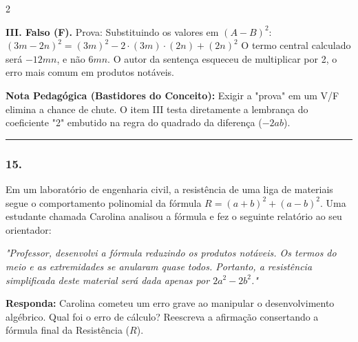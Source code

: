 \begin{multicols*}{2}
\begin{tcolorbox}[colback=CorTitUm!5, colframe=CorTitUm, boxrule=1pt, arc=4pt, left=6pt, right=6pt, top=6pt, bottom=6pt]
    \textbf{III. Falso (F).}
    Prova: Substituindo os valores em $ (A - B)^2 $:
    $ (3m - 2n)^2 = (3m)^2 - 2 \cdot (3m) \cdot (2n) + (2n)^2 $
    O termo central calculado será $ -12mn $, e não $ 6mn $. O autor da sentença esqueceu de multiplicar por 2, o erro mais comum em produtos notáveis.
    \end{tcolorbox}
    \vspace{0.15cm}
    
    \begin{boxexplicacao}
    \textbf{Nota Pedagógica (Bastidores do Conceito):} Exigir a "prova" em um V/F elimina a chance de chute. O item III testa diretamente a lembrança do coeficiente "2" embutido na regra do quadrado da diferença ($ -2ab $).
    \end{boxexplicacao}
\fi

\par\vspace{\espacoQuestao}

\noindent\textcolor{CorLinha}{\rule{\linewidth}{0.5pt}} 
\par\vspace{\espacoPreQuestao}
\subsubsection*{15.} 
\begin{enunciadoLiteral}
Em um laboratório de engenharia civil, a resistência de uma liga de materiais segue o comportamento polinomial da fórmula $ R = (a + b)^2 + (a - b)^2 $. Uma estudante chamada Carolina analisou a fórmula e fez o seguinte relatório ao seu orientador:

\textit{"Professor, desenvolvi a fórmula reduzindo os produtos notáveis. Os termos do meio e as extremidades se anularam quase todos. Portanto, a resistência simplificada deste material será dada apenas por $ 2a^2 - 2b^2 $."}

\begin{boxresponda}
\textbf{Responda:} Carolina cometeu um erro grave ao manipular o desenvolvimento algébrico. Qual foi o erro de cálculo? Reescreva a afirmação consertando a fórmula final da Resistência ($R$).
\end{boxresponda}
\end{enunciadoLiteral}


\end{multicols*}
